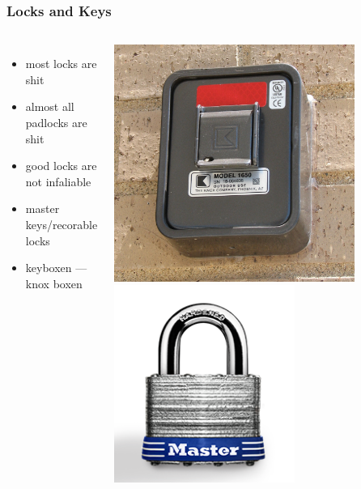\documentclass[]{beamer}
\begin{document}
\begin{frame}
  \frametitle{Locks and Keys}
  \begin{columns}[c]
    \begin{itemize}
      \item most locks are shit
      \item almost all padlocks are shit
      \item good locks are not infaliable
      \item master keys/recorable locks
      \item keyboxen --- knox boxen
    \end{itemize}
    \includegraphics[width=0.8\textwidth]{Knox-Box}
    \vspace{1mm}
    \includegraphics[width=0.6\textwidth]{masterlock}

  \end{columns}
\end{frame}
\end{document}
